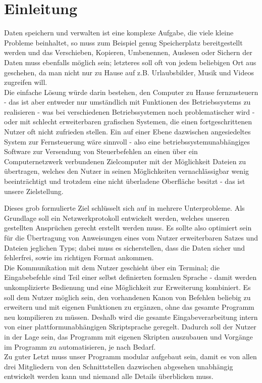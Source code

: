 \documentclass[12pt,a4paper]{scrartcl}
\begin{document}
\section*{Einleitung}
Daten speichern und verwalten ist eine komplexe Aufgabe, die viele kleine Probleme beinhaltet, so muss zum Beispiel genug Speicherplatz bereitgestellt werden und das Verschieben, Kopieren, Umbenennen, Auslesen oder Sichern der Daten muss ebenfalls möglich sein; letzteres soll oft von jedem beliebigen Ort aus geschehen, da man nicht nur zu Hause auf z.B. Urlaubsbilder, Musik und Videos zugreifen will.\\
Die einfache Lösung würde darin bestehen, den Computer zu Hause fernzusteuern - das ist aber entweder nur umständlich mit Funktionen des Betriebssystems zu realisieren - was bei verschiedenen Betriebssystemen noch problematischer wird - oder mit schlecht erweiterbaren grafischen Systemen, die einen fortgeschrittenen Nutzer oft nicht zufrieden stellen.
Ein auf einer Ebene dazwischen angesiedeltes System zur Fernsteuerung wäre sinnvoll - also eine betriebssystemunabhängiges Software zur Versendung von Steuerbefehlen an einen über ein Computernetzwerk verbundenen Zielcomputer mit der Möglichkeit Dateien zu übertragen, welches den Nutzer in seinen Möglichkeiten vernachlässigbar wenig beeinträchtigt und trotzdem eine nicht überladene Oberfläche besitzt - das ist unsere Zielstellung.

Dieses grob formulierte Ziel schlüsselt sich auf in mehrere Unterprobleme. Als Grundlage soll ein Netzwerkprotokoll entwickelt werden, welches unseren gestellten Ansprüchen gerecht erstellt werden muss. Es sollte also optimiert sein für die Übertragung von Anweisungen eines vom Nutzer erweiterbaren Satzes und Dateien jeglichen Typs; dabei muss es sicherstellen, dass die Daten sicher und fehlerfrei, sowie im richtigen Format ankommen.\\
Die Kommunikation mit dem Nutzer geschieht über ein Terminal; die Eingabebefehle sind Teil einer selbst definierten formalen Sprache - damit werden unkomplizierte Bedienung und eine Möglichkeit zur Erweiterung kombiniert.
Es soll dem Nutzer möglich sein, den vorhandenen Kanon von Befehlen beliebig zu erweitern und mit eigenen Funktionen zu ergänzen, ohne das gesamte Programm neu kompilieren zu müssen. Deshalb wird die gesamte Eingabeverarbeitung intern von einer plattformunabhängigen Skriptsprache geregelt.
Dadurch soll der Nutzer in der Lage sein, das Programm mit eigenen Skripten auszubauen und Vorgänge im Programm zu automatisieren, je nach Bedarf.\\
Zu guter Letzt muss unser Programm modular aufgebaut sein, damit es von allen drei Mitgliedern von den Schnittstellen dazwischen abgesehen unabhängig entwickelt werden kann und niemand alle Details überblicken muss.
\end{document}
